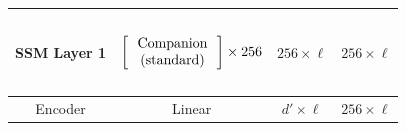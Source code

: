 \begin{table}[]
\begin{tabular}{@{}c|c|c|c@{}}
SSM Layer 1 & \begin{math}\begin{aligned}    \begin{matrix}    \text{\phantom{-}} \\    \end{matrix}    \\    \begin{bmatrix}    \text{\phantom{-} Companion \phantom{-}}   \\ \text{(standard)} \\    \end{bmatrix}    \times 256     \\    \begin{matrix}    \text{\phantom{-}} \\    \end{matrix}    \\\end{aligned}\end{math} & $256 \times \ell$                       & $256 \times \ell$                       \\ \midrule
Encoder     & Linear                                                                                                                                                                                                                                                                                                         & $d' \times \ell$                        & $256 \times \ell$                       \\ \bottomrule
\end{tabular}
\end{table}




